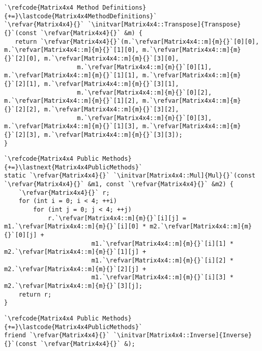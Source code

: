 \begin{lstlisting}
`\refcode{Matrix4x4 Method Definitions}{+=}\lastcode{Matrix4x4MethodDefinitions}`
`\refvar{Matrix4x4}{}` `\initvar[Matrix4x4::Transpose]{Transpose}{}`(const `\refvar{Matrix4x4}{}` &m) {
   return `\refvar{Matrix4x4}{}`(m.`\refvar[Matrix4x4::m]{m}{}`[0][0], m.`\refvar[Matrix4x4::m]{m}{}`[1][0], m.`\refvar[Matrix4x4::m]{m}{}`[2][0], m.`\refvar[Matrix4x4::m]{m}{}`[3][0],
                    m.`\refvar[Matrix4x4::m]{m}{}`[0][1], m.`\refvar[Matrix4x4::m]{m}{}`[1][1], m.`\refvar[Matrix4x4::m]{m}{}`[2][1], m.`\refvar[Matrix4x4::m]{m}{}`[3][1],
                    m.`\refvar[Matrix4x4::m]{m}{}`[0][2], m.`\refvar[Matrix4x4::m]{m}{}`[1][2], m.`\refvar[Matrix4x4::m]{m}{}`[2][2], m.`\refvar[Matrix4x4::m]{m}{}`[3][2],
                    m.`\refvar[Matrix4x4::m]{m}{}`[0][3], m.`\refvar[Matrix4x4::m]{m}{}`[1][3], m.`\refvar[Matrix4x4::m]{m}{}`[2][3], m.`\refvar[Matrix4x4::m]{m}{}`[3][3]);
}
\end{lstlisting}

\begin{lstlisting}
`\refcode{Matrix4x4 Public Methods}{+=}\lastnext{Matrix4x4PublicMethods}`
static `\refvar{Matrix4x4}{}` `\initvar[Matrix4x4::Mul]{Mul}{}`(const `\refvar{Matrix4x4}{}` &m1, const `\refvar{Matrix4x4}{}` &m2) {
    `\refvar{Matrix4x4}{}` r;
    for (int i = 0; i < 4; ++i)
        for (int j = 0; j < 4; ++j)
            r.`\refvar[Matrix4x4::m]{m}{}`[i][j] = m1.`\refvar[Matrix4x4::m]{m}{}`[i][0] * m2.`\refvar[Matrix4x4::m]{m}{}`[0][j] + 
                        m1.`\refvar[Matrix4x4::m]{m}{}`[i][1] * m2.`\refvar[Matrix4x4::m]{m}{}`[1][j] + 
                        m1.`\refvar[Matrix4x4::m]{m}{}`[i][2] * m2.`\refvar[Matrix4x4::m]{m}{}`[2][j] + 
                        m1.`\refvar[Matrix4x4::m]{m}{}`[i][3] * m2.`\refvar[Matrix4x4::m]{m}{}`[3][j];
    return r;
}
\end{lstlisting}

\begin{lstlisting}
`\refcode{Matrix4x4 Public Methods}{+=}\lastcode{Matrix4x4PublicMethods}`
friend `\refvar{Matrix4x4}{}` `\initvar[Matrix4x4::Inverse]{Inverse}{}`(const `\refvar{Matrix4x4}{}` &);
\end{lstlisting}